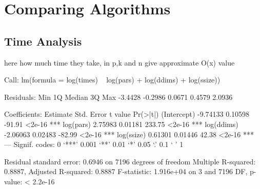 \chapter{Comparing Algorithms}


\section{Time Analysis}

here how much time they take, in p,k and n give approximate O(x) value

\begin{Schunk}
\begin{Soutput}
Call:
lm(formula = log(times) ~ log(pars) + log(ddims) + log(ssize))

Residuals:
    Min      1Q  Median      3Q     Max 
-3.4428 -0.2986  0.0671  0.4579  2.0936 

Coefficients:
            Estimate Std. Error t value Pr(>|t|)    
(Intercept) -9.74133    0.10598  -91.91   <2e-16 ***
log(pars)    2.75983    0.01181  233.75   <2e-16 ***
log(ddims)  -2.06063    0.02483  -82.99   <2e-16 ***
log(ssize)   0.61301    0.01446   42.38   <2e-16 ***
---
Signif. codes:  0 ‘***’ 0.001 ‘**’ 0.01 ‘*’ 0.05 ‘.’ 0.1 ‘ ’ 1

Residual standard error: 0.6946 on 7196 degrees of freedom
Multiple R-squared:  0.8887,	Adjusted R-squared:  0.8887 
F-statistic: 1.916e+04 on 3 and 7196 DF,  p-value: < 2.2e-16
\end{Soutput}
\end{Schunk}

